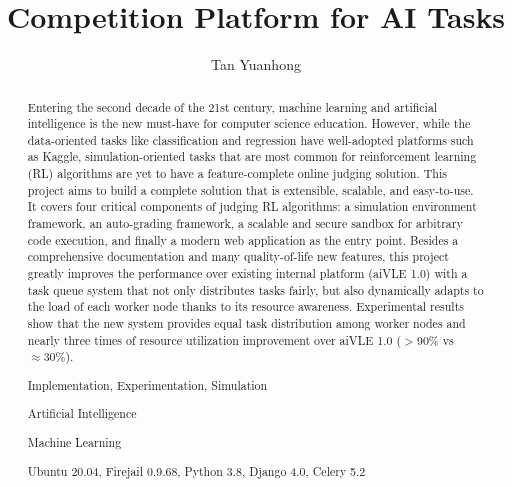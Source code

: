\documentclass[fyp]{socreport}
\begin{document}
\title{Competition Platform for AI Tasks}
\author{Tan Yuanhong}
\maketitle
\begin{abstract}
Entering the second decade of the 21st century, machine learning and artificial intelligence is the new must-have for computer science education. However, while the data-oriented tasks like classification and regression have well-adopted platforms such as Kaggle, simulation-oriented tasks that are most common for reinforcement learning (RL) algorithms are yet to have a feature-complete online judging solution. This project aims to build a complete solution that is extensible, scalable, and easy-to-use. It covers four critical components of judging RL algorithms: a simulation environment framework, an auto-grading framework, a scalable and secure sandbox for arbitrary code execution, and finally a modern web application as the entry point. Besides a comprehensive documentation and many quality-of-life new features, this project greatly improves the performance over existing internal platform (aiVLE 1.0) with a task queue system that not only distributes tasks fairly, but also dynamically adapts to the load of each worker node thanks to its resource awareness. Experimental results show that the new system provides equal task distribution among worker nodes and nearly three times of resource utilization improvement over aiVLE 1.0 ($>90\%$ vs $\approx 30\%$).

\begin{project-nature}
	Implementation, Experimentation, Simulation
\end{project-nature}
\begin{keywords}
    \item Artificial Intelligence
	\item Machine Learning
\end{keywords}
\begin{implement}
	Ubuntu 20.04, Firejail 0.9.68, Python 3.8, Django 4.0, Celery 5.2
\end{implement}

\end{abstract}
\end{document}
